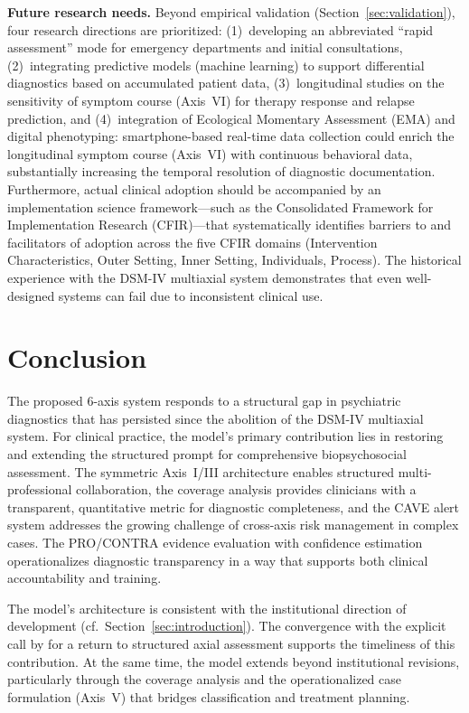 \documentclass[11pt,a4paper]{article}
\begin{document}
\textbf{Future research needs.} Beyond empirical validation (Section~\ref{sec:validation}), four research directions are prioritized: (1)~developing an abbreviated ``rapid assessment'' mode for emergency departments and initial consultations, (2)~integrating predictive models (machine learning) to support differential diagnostics based on accumulated patient data, (3)~longitudinal studies on the sensitivity of symptom course (Axis~VI) for therapy response and relapse prediction, and (4)~integration of Ecological Momentary Assessment (EMA) and digital phenotyping: smartphone-based real-time data collection could enrich the longitudinal symptom course (Axis~VI) with continuous behavioral data, substantially increasing the temporal resolution of diagnostic documentation. Furthermore, actual clinical adoption should be accompanied by an implementation science framework---such as the Consolidated Framework for Implementation Research (CFIR)---that systematically identifies barriers to and facilitators of adoption across the five CFIR domains (Intervention Characteristics, Outer Setting, Inner Setting, Individuals, Process). The historical experience with the DSM-IV multiaxial system demonstrates that even well-designed systems can fail due to inconsistent clinical use.

\section{Conclusion}
\label{sec:conclusion}

The proposed 6-axis system responds to a structural gap in psychiatric diagnostics that has persisted since the abolition of the DSM-IV multiaxial system. For clinical practice, the model's primary contribution lies in restoring and extending the structured prompt for comprehensive biopsychosocial assessment. The symmetric Axis~I/III architecture enables structured multi-professional collaboration, the coverage analysis provides clinicians with a transparent, quantitative metric for diagnostic completeness, and the CAVE alert system addresses the growing challenge of cross-axis risk management in complex cases. The PRO/CONTRA evidence evaluation with confidence estimation operationalizes diagnostic transparency in a way that supports both clinical accountability and training.

The model's architecture is consistent with the institutional direction of development (cf.\ Section~\ref{sec:introduction}). The convergence with the explicit call by \citet{ErlichFirst2025} for a return to structured axial assessment supports the timeliness of this contribution. At the same time, the model extends beyond institutional revisions, particularly through the coverage analysis and the operationalized case formulation (Axis~V) that bridges classification and treatment planning.
\end{document}
